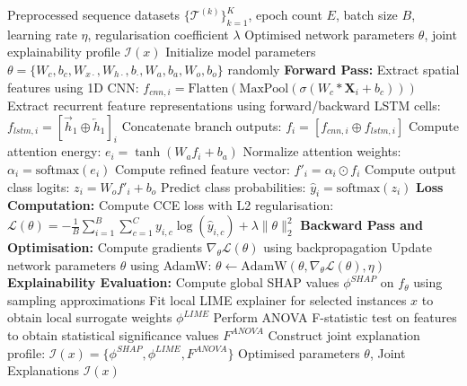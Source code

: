 \documentclass[a4paper,fleqn]{cas-sc}
\begin{document}
\begin{algorithm}
\caption{End-to-End Training and Explainable Verification of the Hybrid Framework}
\label{alg:training}
\begin{algorithmic}[1]
\REQUIRE Preprocessed sequence datasets $\{\mathcal{T}^{(k)}\}_{k=1}^{K}$, epoch count $E$, batch size $B$, learning rate $\eta$, regularisation coefficient $\lambda$
\ENSURE Optimised network parameters $\theta$, joint explainability profile $\mathcal{I}(x)$
\STATE Initialize model parameters $\theta = \{W_c, b_c, W_{x\cdot}, W_{h\cdot}, b_{\cdot}, W_a, b_a, W_o, b_o\}$ randomly
        \STATE \textbf{Forward Pass:}
            \STATE Extract spatial features using 1D CNN: $f_{cnn, i} = \text{Flatten}(\text{MaxPool}(\sigma(W_c * \mathbf{X}_i + b_c)))$
            \STATE Extract recurrent feature representations using forward/backward LSTM cells: $f_{lstm, i} = [\overrightarrow{h}_1 \oplus \overleftarrow{h}_1]_i$
            \STATE Concatenate branch outputs: $f_i = [f_{cnn, i} \oplus f_{lstm, i}]$
            \STATE Compute attention energy: $e_i = \tanh(W_a f_i + b_a)$
            \STATE Normalize attention weights: $\alpha_i = \text{softmax}(e_i)$
            \STATE Compute refined feature vector: $f'_i = \alpha_i \odot f_i$
            \STATE Compute output class logits: $z_i = W_o f'_i + b_o$
            \STATE Predict class probabilities: $\hat{y}_i = \text{softmax}(z_i)$
        \ENDFOR
        \STATE \textbf{Loss Computation:}
        \STATE Compute CCE loss with L2 regularisation: $\mathcal{L}(\theta) = - \frac{1}{B} \sum_{i=1}^B \sum_{c=1}^C y_{i,c} \log(\hat{y}_{i,c}) + \lambda \|\theta\|_2^2$
        \STATE \textbf{Backward Pass and Optimisation:}
        \STATE Compute gradients $\nabla_\theta \mathcal{L}(\theta)$ using backpropagation
        \STATE Update network parameters $\theta$ using AdamW: $\theta \leftarrow \text{AdamW}(\theta, \nabla_\theta \mathcal{L}(\theta), \eta)$
    \ENDFOR
\ENDFOR
\STATE \textbf{Explainability Evaluation:}
\STATE Compute global SHAP values $\phi^{SHAP}$ on $f_\theta$ using sampling approximations
\STATE Fit local LIME explainer for selected instances $x$ to obtain local surrogate weights $\phi^{LIME}$
\STATE Perform ANOVA F-statistic test on features to obtain statistical significance values $F^{ANOVA}$
\STATE Construct joint explanation profile: $\mathcal{I}(x) = \{\phi^{SHAP}, \phi^{LIME}, F^{ANOVA}\}$
\RETURN Optimised parameters $\theta$, Joint Explanations $\mathcal{I}(x)$
\end{algorithmic}
\end{algorithm}
\end{document}
